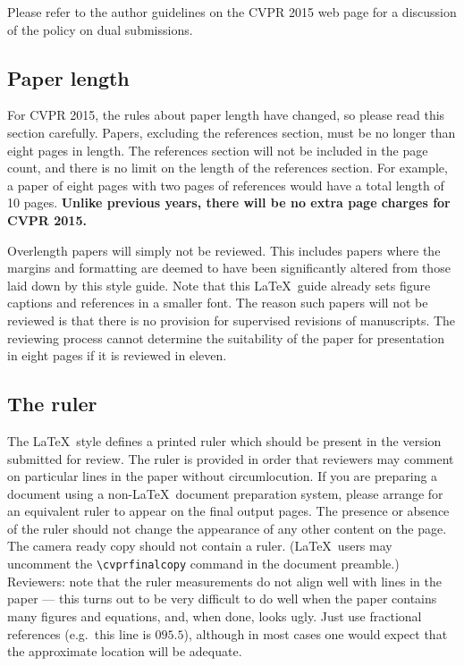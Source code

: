 \documentclass[10pt,twocolumn,letterpaper]{article}
\begin{document}
Please refer to the author guidelines on the CVPR 2015 web page for a
discussion of the policy on dual submissions.

\subsection{Paper length}
For CVPR 2015, the rules about paper length have changed, so please
read this section carefully. Papers, excluding the references section,
must be no longer than eight pages in length. The references section
will not be included in the page count, and there is no limit on the
length of the references section. For example, a paper of eight pages
with two pages of references would have a total length of 10 pages.
{\bf Unlike previous years, there will be no extra page charges for
  CVPR 2015.}

Overlength papers will simply not be reviewed.  This includes papers
where the margins and formatting are deemed to have been significantly
altered from those laid down by this style guide.  Note that this
\LaTeX\ guide already sets figure captions and references in a smaller font.
The reason such papers will not be reviewed is that there is no provision for
supervised revisions of manuscripts.  The reviewing process cannot determine
the suitability of the paper for presentation in eight pages if it is
reviewed in eleven.  

\subsection{The ruler}
The \LaTeX\ style defines a printed ruler which should be present in the
version submitted for review.  The ruler is provided in order that
reviewers may comment on particular lines in the paper without
circumlocution.  If you are preparing a document using a non-\LaTeX\
document preparation system, please arrange for an equivalent ruler to
appear on the final output pages.  The presence or absence of the ruler
should not change the appearance of any other content on the page.  The
camera ready copy should not contain a ruler. (\LaTeX\ users may uncomment
the \verb'\cvprfinalcopy' command in the document preamble.)  Reviewers:
note that the ruler measurements do not align well with lines in the paper
--- this turns out to be very difficult to do well when the paper contains
many figures and equations, and, when done, looks ugly.  Just use fractional
references (e.g.\ this line is $095.5$), although in most cases one would
expect that the approximate location will be adequate.
\end{document}

